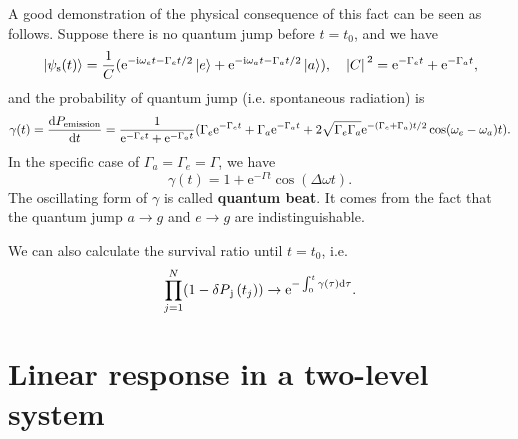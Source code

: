 \documentclass[hyperref, a4paper]{article}
\newcommand*{\ii}{\mathrm{i}}
\newcommand*{\ee}{\mathrm{e}}
\newcommand*{\concept}[1]{{\textbf{#1}}}
\begin{document}
A good demonstration of the physical consequence of this fact can be seen as follows.
Suppose there is no quantum jump before $t = t_0$, and we have 
\begin{equation}
    \ket*{\psi_\text{s}(t)} = \frac{1}{C} (\ee^{-\ii \omega_e t - \Gamma_e t / 2} \ket*{e} + \ee^{- \ii \omega_a t - \Gamma_a t/ 2} \ket*{a}), 
    \quad {\abs*{C}^2} = \ee^{- \Gamma_e t } + \ee^{- \Gamma_a t},
\end{equation}
and the probability of quantum jump (i.e. spontaneous radiation) is 
\begin{equation}
    \gamma(t) = \dv{P_\text{emission}}{t} = \frac{1}{\ee^{- \Gamma_e t } + \ee^{- \Gamma_a t}} (\Gamma_e \ee^{- \Gamma_e t} + \Gamma_a \ee^{- \Gamma_a t} + 2 \sqrt{\Gamma_e \Gamma_a} \ee^{- (\Gamma_e + \Gamma_a) t / 2} \cos(\omega_e - \omega_a) t ).
\end{equation}
In the specific case of $\Gamma_a = \Gamma_e = \Gamma$, we have 
\begin{equation}
    \gamma(t) = 1 + \ee^{- \Gamma t} \cos(\Delta \omega t).
\end{equation}
The oscillating form of $\gamma$ is called \concept{quantum beat}. It comes from the fact that the quantum jump
$a \to g$ and $e \to g$ are indistinguishable.

We can also calculate the survival ratio until $t=t_0$, i.e. 
\begin{equation}
    \prod_{j=1}^N (1 - \var{P}_\text{j}(t_j)) \to \ee^{- \int_0^t \gamma(\tau) \dd{\tau}}.
\end{equation}

\section{Linear response in a two-level system}
\end{document}
